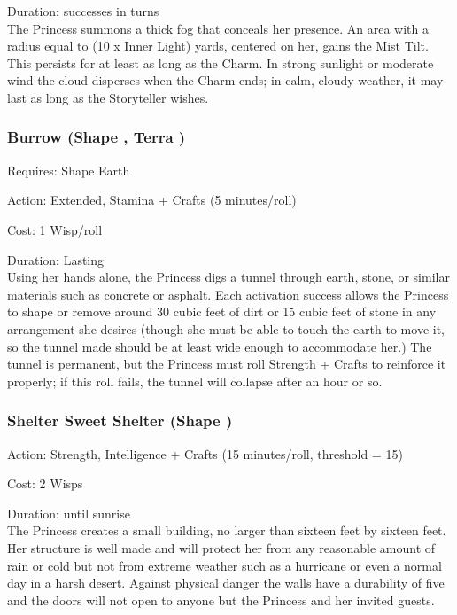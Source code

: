 \noindent Duration: successes in turns \\

\noindent The Princess summons a thick fog that conceals her presence. An area with a radius equal to (10 x Inner Light) yards, centered on her, gains the Mist Tilt. This persists for at least as long as the Charm. In strong sunlight or moderate wind the cloud disperses when the Charm ends; in calm, cloudy weather, it may last as long as the Storyteller wishes.




\subsubsection*{Burrow (Shape \textbullet\textbullet\textbullet, Terra \textbullet\textbullet)}

\noindent Requires: Shape Earth

\noindent Action: Extended, Stamina + Crafts (5 minutes/roll)

\noindent Cost: 1 Wisp/roll

\noindent Duration: Lasting \\

\noindent Using her hands alone, the Princess digs a tunnel through earth, stone, or similar materials such as concrete or asphalt. Each activation success allows the Princess to shape or remove around 30 cubic feet of dirt or 15 cubic feet of stone in any arrangement she desires (though she must be able to touch the earth to move it, so the tunnel made should be at least wide enough to accommodate her.) The tunnel is permanent, but the Princess must roll Strength + Crafts to reinforce it properly; if this roll fails, the tunnel will collapse after an hour or so.

\subsubsection*{Shelter Sweet Shelter (Shape \textbullet\textbullet\textbullet\textbullet)}
\noindent Action: Strength, Intelligence + Crafts (15 minutes/roll, threshold = 15)

\noindent Cost: 2 Wisps

\noindent Duration: until sunrise\\

The Princess creates a small building, no larger than sixteen feet by sixteen feet. Her structure is well made and will protect her from any reasonable amount of rain or cold but not from extreme weather such as a hurricane or even a normal day in a harsh desert. Against physical danger the walls have a durability of five and the doors will not open to anyone but the Princess and her invited guests.

